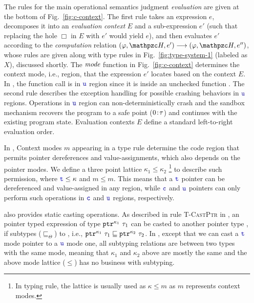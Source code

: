 The rules for the main operational semantics
judgment \emph{evaluation} are given at the bottom of
Fig.~\ref{fig:c-context}.
The first rule takes an expression $e$, decomposes
it into an \emph{evaluation context} $E$ and a sub-expression $e'$
(such that replacing the hole $\Box$ in $E$ with $e'$ would yield
$e$), and then evaluates $e'$ according to the \emph{computation}
  relation $(\varphi,\heap,e') \longrightarrow (\varphi,\heap,e'')$,
whose rules are given along with type rules in Fig.~\ref{fig:type-system-1} (labeled as $X$), discussed
shortly.
The $\textit{mode}$ function in Fig.~\ref{fig:c-context}
determines the context mode, i.e., region, that the expression $e'$ locates based on the context $E$.
In , the function call  is in $\textcolor{blue}{\texttt{u}}$ region since it is inside an unchecked function .
The second rule describes the exception handling 
for possible crashing behaviors in $\textcolor{blue}{\texttt{u}}$ regions.
Operations in $\textcolor{blue}{\texttt{u}}$ region can non-deterministically crash
and the \systemname sandbox mechanism recovers
the program to a safe point (${0}\!:\!{\tau}$)
and continues with the existing program state.
Evaluation contexts $E$ define a standard left-to-right evaluation order.

In \lang, Context modes $m$ appearing in a type rule determine the code region 
that permits pointer dereferences and value-assignments, which also depends on the pointer modes.
We define a three point lattice $\kappa_1 \le \kappa_2$ \footnote{In typing rule, the lattice is usually used as $\kappa \le m$ as $m$ represents context modes.} to describe such permission, where $\textcolor{blue}{\texttt{t}} \le \kappa$ and $m \le m$.
This means that a $\textcolor{blue}{\texttt{t}}$ pointer can be dereferenced and value-assigned in any region, while $\textcolor{blue}{\texttt{c}}$ and $\textcolor{blue}{\texttt{u}}$ pointers can only perform such operations in $\textcolor{blue}{\texttt{c}}$ and $\textcolor{blue}{\texttt{u}}$ regions, respectively.

\lang also provides static casting operations. As described in rule \textsc{T-CastPtr} in ,
an pointer typed expression of type $\mathtt{ptr}^{\kappa_1}~{\tau_1}$ can be casted to another pointer type ,
if  subtypes ($\sqsubseteq_{\Theta}$) to , i.e., $\mathtt{ptr}^{\kappa_1}~{\tau_1} \sqsubseteq \mathtt{ptr}^{\kappa_2}~{\tau_2}$.
In \lang, except that we can cast a $\textcolor{blue}{\texttt{t}}$ mode pointer to a $\textcolor{blue}{\texttt{u}}$ mode one, all subtyping relations are between two types with the same mode, meaning that $\kappa_1$ and $\kappa_2$ above are mostly the same and the above mode lattice ($\le$) has no business with subtyping.

